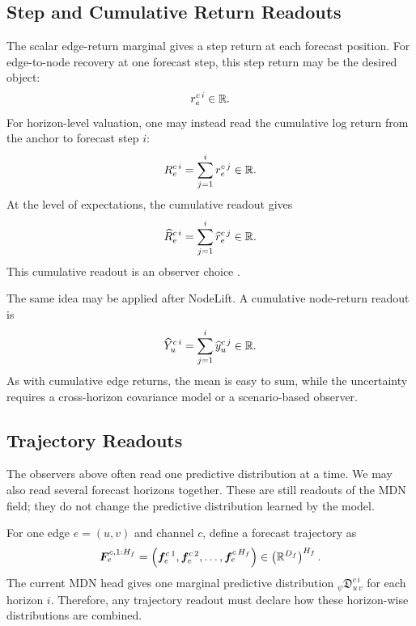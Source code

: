 \subsection{Step and Cumulative Return Readouts}
\label{subsec:step-and-cumulative-return-readouts}

The scalar edge-return marginal gives a step return at each forecast position.
For edge-to-node recovery at one forecast step, this step return may be the
desired object:
\[
  r_e^{c\,i}\in\mathbb{R}.
\]
For horizon-level valuation, one may instead read the cumulative log return from
the anchor to forecast step $i$:
\[
  R_e^{c\,i}
  =
  \sum_{j=1}^{i}
  r_e^{c\,j}
  \in\mathbb{R}.
\]
At the level of expectations, the cumulative readout gives
\[
  \widehat{R}_e^{c\,i}
  =
  \sum_{j=1}^{i}
  \widehat{r}_e^{c\,j}
  \in\mathbb{R}.
\]
This cumulative readout is an observer choice%
.

The same idea may be applied after NodeLift.  A cumulative node-return readout is
\[
  \widehat{Y}_{u}^{c\,i}
  =
  \sum_{j=1}^{i}
  \widehat{y}_{u}^{c\,j}
  \in\mathbb{R}.
\]
As with cumulative edge returns, the mean is easy to sum, while the uncertainty
requires a cross-horizon covariance model or a scenario-based observer.

\subsection{Trajectory Readouts}
\label{subsec:trajectory-readouts}

The observers above often read one predictive distribution at a time.  We may
also read several forecast horizons together.  These are still readouts of the
MDN field; they do not change the predictive distribution learned by the model.

For one edge $e=(u,v)$ and channel $c$, define a forecast trajectory as
\[
  \bm{F}_{e}^{c,1:H_f}
  =
  \left(
    \bm{f}_{e}^{c\,1},
    \bm{f}_{e}^{c\,2},
    \ldots,
    \bm{f}_{e}^{c\,H_f}
  \right)
  \in
  \left(\mathbb{R}^{D_f}\right)^{H_f}.
\]
The current MDN head gives one marginal predictive distribution
${}_{\psi}\mathfrak{D}_{u\,v}^{c\,i}$ for each horizon $i$.  Therefore, any
trajectory readout must declare how these horizon-wise distributions are
combined.

